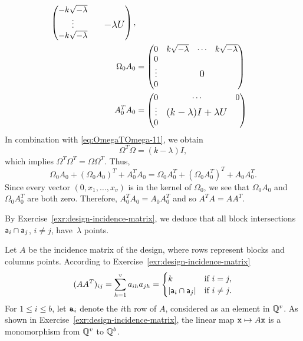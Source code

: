 \begin{solution}
\begin{align*}
\begin{pmatrix}
            -k\sqrt{-\lambda}\\
            \vdots&&\text{\large $-\lambda U$}\\
            -k\sqrt{-\lambda}
        \end{pmatrix},\\
        \Omega_0A_0 &= \begin{pmatrix}
            0&k\sqrt{-\lambda}&\cdots&k\sqrt{-\lambda}\\
            0\\
            \vdots&&\text{\large$0$}\\
            0
        \end{pmatrix}\\
        A^T_0A_0 &= \begin{pmatrix}
            0&\cdots&0\\
            \vdots&\text{\large$(k-\lambda)I+\lambda U$}\\
            0
        \end{pmatrix}
    \end{align*}
    \normalsize
    In combination with \eqref{eq:OmegaTOmega-11}, we obtain
    \begin{equation}\label{eq:k-lambda-is-a-square}
        \Omega^T\Omega=(k-\lambda)I,
    \end{equation}
    which implies $\Omega^T\Omega^T=\Omega\Omega^T$. Thus,
    $$
        \Omega_0A_0+(\Omega_0A_0)^T + A_0^TA_0
        = \Omega_0A_0^T+(\Omega_0A_0^T)^T+A_0A_0^T.
    $$
    Since every vector $(0,x_1,\dots,x_v)$ is in the kernel of $\Omega_0$, we see that $\Omega_0A_0$ and $\Omega_0A_0^T$ are both zero. Therefore, $A_0^TA_0=A_0A_0^T$ and so $A^T\!A=AA^T$.

    By Exercise~\ref{exr:design-incidence-matrix}, we deduce that all block intersections $\mathsf a_i\cap\mathsf a_j$, $i\ne j$, have~$\lambda$ points.
    
\separator

    \citep{Stinson2004}
    Let $A$ be the incidence matrix of the design, where rows represent blocks and columns points. According to Exercise~\ref{exr:design-incidence-matrix}
    \begin{equation}\label{eq:AA^T2}
        (AA^T)_{ij} = \sum_{h=1}^va_{ih}a_{jh}
            = \begin{cases}
                k   &\text{if }i=j,\\
                |\mathsf a_i\cap\mathsf a_j|
                    &\text{if }i\ne j.
            \end{cases}
    \end{equation}
    For $1\le i\le b$, let $\mathtt a_i$ denote the $i$th row of $A$, considered as an element in $\mathbb{Q}^v$. As shown in Exercise~\ref{exr:design-incidence-matrix},
    the linear map $\mathtt x\mapsto A\mathtt x$ is a monomorphism from $\mathbb{Q}^v$ to $\mathbb{Q}^b$.


\end{solution}
